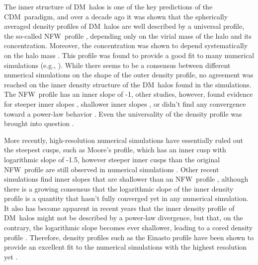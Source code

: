 \documentclass[aps,prd,twocolumn,amsmath,amssymb,floatfix,nofootinbib,10pt]{revtex4}
\newcommand{\eg}{e.g.}
\newcommand{\CDM}{CDM}
\newcommand{\NFW}{NFW}
\newcommand{\DM}{DM}
\begin{document}
The inner structure of \DM\ halos is one of the key predictions of the
\CDM\ paradigm, and over a decade ago it was shown that the
spherically averaged density profiles of \DM\ halos are well described
by a universal profile, the so-called \NFW\ profile
\cite{1995MNRAS.275..720N,1996ApJ...462..563N,1997ApJ...490..493N},
depending only on the virial mass of the halo and its
concentration. Moreover, the concentration was shown to depend
systematically on the halo mass
\cite{1996ApJ...462..563N,1997ApJ...490..493N,2001MNRAS.321..559B,2001ApJ...554..114E,2007MNRAS.381.1450N,2008MNRAS.387..536G}. This
profile was found to provide a good fit to many numerical simulations
(\eg,
\cite{1996MNRAS.281..716C,1997MNRAS.286..865T,1997ApJS..111...73K}).
While there seems to be a consensus between different numerical
simulations on the shape of the outer density profile, no agreement
was reached on the inner density structure of the \DM\ halos found in
the simulations. The \NFW\ profile has an inner slope of -1, other
studies, however, found evidence for steeper inner slopes
\cite{1997ApJ...477L...9F,1998ApJ...499L...5M,1999MNRAS.310.1147M,2000ApJ...544..616G,2001ApJ...554..903K,2001ApJ...557..533F,2004MNRAS.353..624D},
shallower inner slopes \cite{1998ApJ...502...48K}, or didn't find any
convergence toward a power-law behavior
\cite{2003MNRAS.338...14P}. Even the universality of the density
profile was brought into question
\cite{2000ApJ...529L..69J,2000ApJ...535...30J}.

More recently, high-resolution numerical simulations have essentially
ruled out the steepest cusps, such as Moore's profile, which has an
inner cusp with logarithmic slope of -1.5, however steeper inner cusps
than the original \NFW\ profile are still observed in numerical
simulations \cite{2005MNRAS.364..665D}. Other recent simulations find
inner slopes that are shallower than an \NFW\ profile
\cite{2008MNRAS.385..545K,2008arXiv0808.2981S,2008arXiv0810.1522N},
although there is a growing consensus that the logarithmic slope of
the inner density profile is a quantity that hasn't fully converged
yet in any numerical simulation. It also has become apparent in recent
years that the inner density profile of \DM\ halos might not be
described by a power-law divergence, but that, on the contrary, the
logarithmic slope becomes ever shallower, leading to a cored density
profile
\cite{2004MNRAS.349.1039N,2005ApJ...624L..85M,2006AJ....132.2685M,2006AJ....132.2701G,2006MNRAS.365..147S,2008arXiv0808.2981S,2008MNRAS.391.1685S,2008arXiv0810.1522N}. Therefore,
density profiles such as the Einasto profile
\cite{einasto65a,1989A&A...223...89E} have been shown to provide an
excellent fit to the numerical simulations with the highest resolution
yet \cite{2008MNRAS.391.1685S,2008arXiv0808.2981S}.
\end{document}
